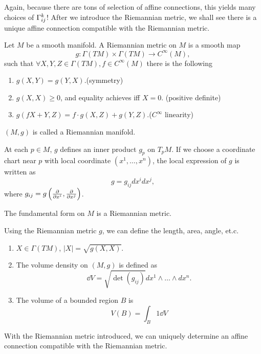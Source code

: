 Again, because there are tons of selection of affine connections,
this yields many choices of \(\Gamma\indices*{_{ij}^k}\)!
After we introduce the Riemannian metric, we shall see there is a unique
affine connection compatible with the Riemannian metric.
\begin{definition}
    Let \(M\) be a smooth manifold. A Riemannian metric on \(M\)
    is a smooth map 
    \[
     g\colon \Gamma(TM)\times \Gamma(TM)\to C^\infty(M),
    \]
    such that 
    \(\forall X,Y,Z\in \Gamma(TM), f\in C^\infty(M)\)
    there is the following 
    \begin{enumerate}[(1)]
        \item \(g(X,Y)=g(Y,X)\).(symmetry)
        \item \(g(X,X)\ge 0\), and equality achieves iff \(X=0\).
        (positive definite)
        \item \(g(f X+Y,Z)=f\cdot g(X,Z)+g(Y,Z)\).(\(C^\infty\) linearity) 
    \end{enumerate}
    \((M,g)\) is called a Riemannian manifold.
\end{definition}
\begin{remark}
    At each \(p\in M\), \(g\) defines an inner product \(g_p\)
    on \(T_p M\). If we choose a coordinate chart near \(p\)
    with local coordinate \((x^1,\ldots,x^n)\),
    the local expression of \(g\) is written as 
    \[
        g=g_{ij}dx^i dx^j    ,
    \]
    where \(g_{ij}=g\left(\pdv{x^i},\pdv{x^j}\right)\).
\end{remark}
\begin{example}
    The  fundamental form on \(M\) is a Riemannian metric.
\end{example}
Using the Riemannian metric \(g\), we can define 
the length, area, angle, et.c.
\begin{definition}
    \begin{enumerate}[(1)]
        \item \(X\in \Gamma(TM)\), \(|X|=\sqrt{g(X,X)}\).
        \item The volume density on \((M,g)\) is defined as 
        \[
            \dd V=\sqrt{\det(g_{ij})} dx^1\wedge\ldots \wedge dx^n .
        \]
        \item The volume of a bounded region \(B\) is 
        \[
            V(B)=\int_B 1 \dd V
        \]
    \end{enumerate}
\end{definition}
With the Riemannian metric introduced, we can uniquely determine
an affine connection compatible with the Riemannian metric.
